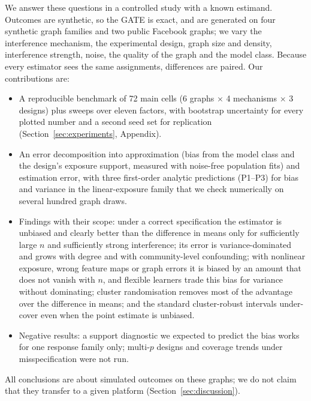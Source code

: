 We answer these questions in a controlled study with a known estimand. Outcomes are synthetic, so the GATE is exact, and are generated on four synthetic graph families and two public Facebook graphs; we vary the interference mechanism, the experimental design, graph size and density, interference strength, noise, the quality of the graph and the model class. Because every estimator sees the same assignments, differences are paired. Our contributions are:
\begin{itemize}
\item A reproducible benchmark of 72 main cells (6 graphs $\times$ 4 mechanisms $\times$ 3 designs) plus sweeps over eleven factors, with bootstrap uncertainty for every plotted number and a second seed set for replication (Section~\ref{sec:experiments}, Appendix).
\item An error decomposition into approximation (bias from the model class and the design's exposure support, measured with noise-free population fits) and estimation error, with three first-order analytic predictions (P1--P3) for bias and variance in the linear-exposure family that we check numerically on several hundred graph draws.
\item Findings with their scope: under a correct specification the estimator is unbiased and clearly better than the difference in means only for sufficiently large $n$ and sufficiently strong interference; its error is variance-dominated and grows with degree and with community-level confounding; with nonlinear exposure, wrong feature maps or graph errors it is biased by an amount that does not vanish with $n$, and flexible learners trade this bias for variance without dominating; cluster randomisation removes most of the advantage over the difference in means; and the standard cluster-robust intervals under-cover even when the point estimate is unbiased.
\item Negative results: a support diagnostic we expected to predict the bias works for one response family only; multi-$p$ designs and coverage trends under misspecification were not run.
\end{itemize}
All conclusions are about simulated outcomes on these graphs; we do not claim that they transfer to a given platform (Section~\ref{sec:discussion}).
